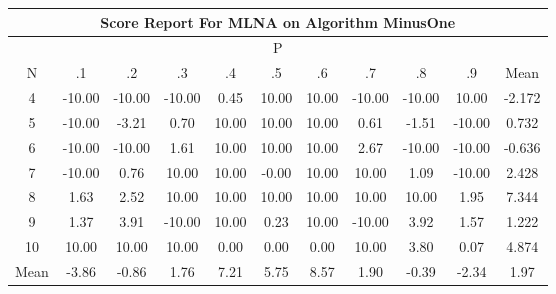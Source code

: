 \documentclass[11pt,a4paper]{report}
\begin{document}
\begin{longtable}{ | c || c | c | c | c | c | c | c | c | c || c |}
\hline
\multicolumn{11}{|c|}{ Score Report For MLNA on Algorithm MinusOne} \\
\hline
\multicolumn{11}{|c|}{ P } \\
\hline
N & .1 & .2 & .3 & .4 & .5 & .6 & .7 & .8 & .9 & Mean\\
 \hline
 \hline
 \endhead
  4 &  \cellcolor[HTML]{FF0000} -10.00 &  \cellcolor[HTML]{FF0000} -10.00 &  \cellcolor[HTML]{FF0000} -10.00 &  \cellcolor[HTML]{F7F7FF} 0.45 &  \cellcolor[HTML]{0808FF} 10.00 &  \cellcolor[HTML]{0808FF} 10.00 &  \cellcolor[HTML]{FF0000} -10.00 &  \cellcolor[HTML]{FF0000} -10.00 &  \cellcolor[HTML]{0808FF} 10.00 & -2.172 \\
  5 &  \cellcolor[HTML]{FF0000} -10.00 &  \cellcolor[HTML]{FFAFAF} -3.21 &  \cellcolor[HTML]{EFEFFF} 0.70 &  \cellcolor[HTML]{0808FF} 10.00 &  \cellcolor[HTML]{0808FF} 10.00 &  \cellcolor[HTML]{0808FF} 10.00 &  \cellcolor[HTML]{EFEFFF} 0.61 &  \cellcolor[HTML]{FFD7D7} -1.51 &  \cellcolor[HTML]{FF0000} -10.00 & 0.732 \\
  6 &  \cellcolor[HTML]{FF0000} -10.00 &  \cellcolor[HTML]{FF0000} -10.00 &  \cellcolor[HTML]{D7D7FF} 1.61 &  \cellcolor[HTML]{0808FF} 10.00 &  \cellcolor[HTML]{0808FF} 10.00 &  \cellcolor[HTML]{0808FF} 10.00 &  \cellcolor[HTML]{BFBFFF} 2.67 &  \cellcolor[HTML]{FF0000} -10.00 &  \cellcolor[HTML]{FF0000} -10.00 & -0.636 \\
  7 &  \cellcolor[HTML]{FF0000} -10.00 &  \cellcolor[HTML]{EFEFFF} 0.76 &  \cellcolor[HTML]{0808FF} 10.00 &  \cellcolor[HTML]{0808FF} 10.00 &  \cellcolor[HTML]{FFFFFF} -0.00 &  \cellcolor[HTML]{0808FF} 10.00 &  \cellcolor[HTML]{0808FF} 10.00 &  \cellcolor[HTML]{E7E7FF} 1.09 &  \cellcolor[HTML]{FF0000} -10.00 & 2.428 \\
  8 &  \cellcolor[HTML]{D7D7FF} 1.63 &  \cellcolor[HTML]{BFBFFF} 2.52 &  \cellcolor[HTML]{0808FF} 10.00 &  \cellcolor[HTML]{0808FF} 10.00 &  \cellcolor[HTML]{0808FF} 10.00 &  \cellcolor[HTML]{0808FF} 10.00 &  \cellcolor[HTML]{0808FF} 10.00 &  \cellcolor[HTML]{0808FF} 10.00 &  \cellcolor[HTML]{CFCFFF} 1.95 & 7.344 \\
  9 &  \cellcolor[HTML]{DFDFFF} 1.37 &  \cellcolor[HTML]{9F9FFF} 3.91 &  \cellcolor[HTML]{FF0000} -10.00 &  \cellcolor[HTML]{0808FF} 10.00 &  \cellcolor[HTML]{F7F7FF} 0.23 &  \cellcolor[HTML]{0808FF} 10.00 &  \cellcolor[HTML]{FF0000} -10.00 &  \cellcolor[HTML]{9F9FFF} 3.92 &  \cellcolor[HTML]{D7D7FF} 1.57 & 1.222 \\
  10 &  \cellcolor[HTML]{0808FF} 10.00 &  \cellcolor[HTML]{0808FF} 10.00 &  \cellcolor[HTML]{0808FF} 10.00 &  \cellcolor[HTML]{FFFFFF} 0.00 &  \cellcolor[HTML]{FFFFFF} 0.00 &  \cellcolor[HTML]{FFFFFF} 0.00 &  \cellcolor[HTML]{0808FF} 10.00 &  \cellcolor[HTML]{9F9FFF} 3.80 &  \cellcolor[HTML]{FFFFFF} 0.07 & 4.874 \\
 \hline
 \hline
Mean &  \cellcolor[HTML]{FF9F9F} -3.86 &  \cellcolor[HTML]{FFE7E7} -0.86 &  \cellcolor[HTML]{CFCFFF} 1.76 &  \cellcolor[HTML]{4848FF} 7.21 &  \cellcolor[HTML]{7070FF} 5.75 &  \cellcolor[HTML]{2828FF} 8.57 &  \cellcolor[HTML]{CFCFFF} 1.90 &  \cellcolor[HTML]{FFF7F7} -0.39 &  \cellcolor[HTML]{FFC7C7} -2.34 &  \cellcolor[HTML]{CFCFFF} 1.97
\end{longtable}
\end{document}
